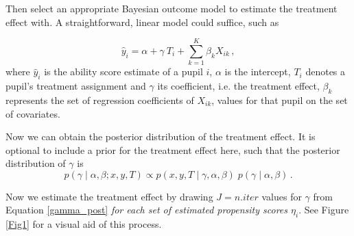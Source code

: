 \documentclass{article}
\begin{document}
Then select an appropriate Bayesian outcome model to estimate the treatment effect with. A straightforward, linear model could suffice, such as 

\begin{equation}\label{outcome}
\hat{y}_i = \alpha + \gamma \:T_i + \sum_{k=1}^{K} \beta _k X_{ik}\,,
\end{equation}
where $\hat{y}_i$ is the ability score estimate of a pupil $i$, $\alpha$ is the intercept, $T_i$ denotes a pupil's treatment assignment and $\gamma$ its coefficient, i.e. the treatment effect, $\beta_k$ represents the set of regression coefficients of $X_{ik}$, values for that pupil on the set of covariates.

Now we can obtain the posterior distribution of the treatment effect. It is optional to include a prior for the treatment effect here, such that the posterior distribution of $\gamma$ is
\begin{equation} \label{gamma_post}
p(\gamma \mid \alpha, \beta; x, y, T) \propto p(x, y, T \mid \gamma, \alpha, \beta) \; p(\gamma \mid \alpha, \beta) \,.
\end{equation}

Now we estimate the treatment effect by drawing $J = n.iter$ values for $\gamma$ from Equation \ref{gamma_post} \emph{for each set of estimated propensity scores $\eta_i$}. See Figure \ref{Fig1} for a visual aid of this process. 
\vspace{1cm}
\end{document}
